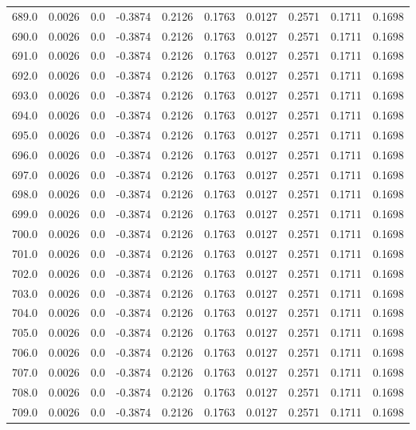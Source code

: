 \begin{longtable}{lrrrrrrrrr}
689.0 & 0.0026 & 0.0 & -0.3874 & 0.2126 & 0.1763 & 0.0127 & 0.2571 & 0.1711 & 0.1698 \\
690.0 & 0.0026 & 0.0 & -0.3874 & 0.2126 & 0.1763 & 0.0127 & 0.2571 & 0.1711 & 0.1698 \\
691.0 & 0.0026 & 0.0 & -0.3874 & 0.2126 & 0.1763 & 0.0127 & 0.2571 & 0.1711 & 0.1698 \\
692.0 & 0.0026 & 0.0 & -0.3874 & 0.2126 & 0.1763 & 0.0127 & 0.2571 & 0.1711 & 0.1698 \\
693.0 & 0.0026 & 0.0 & -0.3874 & 0.2126 & 0.1763 & 0.0127 & 0.2571 & 0.1711 & 0.1698 \\
694.0 & 0.0026 & 0.0 & -0.3874 & 0.2126 & 0.1763 & 0.0127 & 0.2571 & 0.1711 & 0.1698 \\
695.0 & 0.0026 & 0.0 & -0.3874 & 0.2126 & 0.1763 & 0.0127 & 0.2571 & 0.1711 & 0.1698 \\
696.0 & 0.0026 & 0.0 & -0.3874 & 0.2126 & 0.1763 & 0.0127 & 0.2571 & 0.1711 & 0.1698 \\
697.0 & 0.0026 & 0.0 & -0.3874 & 0.2126 & 0.1763 & 0.0127 & 0.2571 & 0.1711 & 0.1698 \\
698.0 & 0.0026 & 0.0 & -0.3874 & 0.2126 & 0.1763 & 0.0127 & 0.2571 & 0.1711 & 0.1698 \\
699.0 & 0.0026 & 0.0 & -0.3874 & 0.2126 & 0.1763 & 0.0127 & 0.2571 & 0.1711 & 0.1698 \\
700.0 & 0.0026 & 0.0 & -0.3874 & 0.2126 & 0.1763 & 0.0127 & 0.2571 & 0.1711 & 0.1698 \\
701.0 & 0.0026 & 0.0 & -0.3874 & 0.2126 & 0.1763 & 0.0127 & 0.2571 & 0.1711 & 0.1698 \\
702.0 & 0.0026 & 0.0 & -0.3874 & 0.2126 & 0.1763 & 0.0127 & 0.2571 & 0.1711 & 0.1698 \\
703.0 & 0.0026 & 0.0 & -0.3874 & 0.2126 & 0.1763 & 0.0127 & 0.2571 & 0.1711 & 0.1698 \\
704.0 & 0.0026 & 0.0 & -0.3874 & 0.2126 & 0.1763 & 0.0127 & 0.2571 & 0.1711 & 0.1698 \\
705.0 & 0.0026 & 0.0 & -0.3874 & 0.2126 & 0.1763 & 0.0127 & 0.2571 & 0.1711 & 0.1698 \\
706.0 & 0.0026 & 0.0 & -0.3874 & 0.2126 & 0.1763 & 0.0127 & 0.2571 & 0.1711 & 0.1698 \\
707.0 & 0.0026 & 0.0 & -0.3874 & 0.2126 & 0.1763 & 0.0127 & 0.2571 & 0.1711 & 0.1698 \\
708.0 & 0.0026 & 0.0 & -0.3874 & 0.2126 & 0.1763 & 0.0127 & 0.2571 & 0.1711 & 0.1698 \\
709.0 & 0.0026 & 0.0 & -0.3874 & 0.2126 & 0.1763 & 0.0127 & 0.2571 & 0.1711 & 0.1698 \\

\end{longtable}
